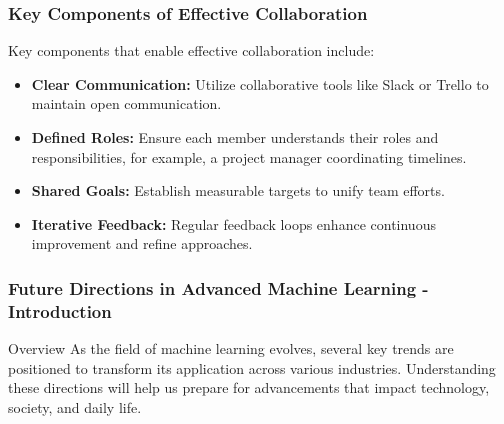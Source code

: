 \documentclass[aspectratio=169]{beamer}
\begin{document}
\begin{frame}[fragile]
    \frametitle{Key Components of Effective Collaboration}
    Key components that enable effective collaboration include:
    
    \begin{itemize}
        \item \textbf{Clear Communication:} 
        Utilize collaborative tools like Slack or Trello to maintain open communication.

        \item \textbf{Defined Roles:} 
        Ensure each member understands their roles and responsibilities, for example, a project manager coordinating timelines.

        \item \textbf{Shared Goals:} 
        Establish measurable targets to unify team efforts.

        \item \textbf{Iterative Feedback:} 
        Regular feedback loops enhance continuous improvement and refine approaches.
    \end{itemize}
\end{frame}

\begin{frame}[fragile]
    \frametitle{Future Directions in Advanced Machine Learning - Introduction}
    \begin{block}{Overview}
        As the field of machine learning evolves, several key trends are positioned to transform its application across various industries. 
        Understanding these directions will help us prepare for advancements that impact technology, society, and daily life.
    \end{block}
\end{frame}
\end{document}
